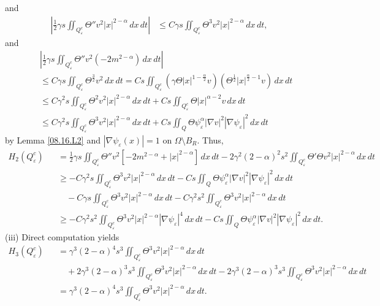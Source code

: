 \documentclass[11pt]{article}
\numberwithin{equation}{section}
\begin{document}
and
$$
\begin{aligned}
\left| \frac{1}{2}\gamma s \iint_{Q_\varepsilon^c} \Theta'' v^2 |x|^{2 - \alpha} \, dx \, dt \right| &\leq C\gamma s \iint_{Q_\varepsilon^c} \Theta^3 v^2 |x|^{2 - \alpha} \, dx \, dt,
\end{aligned}
$$
and
\begin{eqnarray*}
&&\left| \frac{1}{2}\gamma s \iint_{Q_\varepsilon^c} \Theta'' v^2 (-2m^{2 - \alpha}) \, dx \, dt \right| \\
&&\leq C\gamma s \iint_{Q_\varepsilon^c} \Theta^{\frac{3}{2}} v^2 \, dx \, dt = Cs \iint_{Q_\varepsilon^c} \left(\gamma \Theta |x|^{1 - \frac{\alpha}{2}} v\right) \left(\Theta^{\frac{1}{2}} |x|^{\frac{\alpha}{2} - 1} v\right) \, dx \, dt \\
&&\leq C\gamma^2 s \iint_{Q_\varepsilon^c} \Theta^2 v^2 |x|^{2 - \alpha} \, dx \, dt + C s \iint_{Q_\varepsilon^c} \Theta |x|^{\alpha - 2} v \, dx \, dt \\
&&\leq C\gamma^2s \iint_{Q_\varepsilon^c} \Theta^3 v^2 |x|^{2 - \alpha} \, dx \, dt + Cs \iint_{Q} \Theta \psi_\varepsilon^\alpha |\nabla v|^2 |\nabla \psi_\varepsilon|^2 \, dx \, dt
\end{eqnarray*}
by Lemma \ref{08.16.L2} and $|\nabla \psi_\varepsilon(x)| = 1$ on $\Omega \setminus B_R$.
Thus,
\begin{eqnarray*}
H_2(Q_\varepsilon^c) &&= \frac{1}{2}\gamma s \iint_{Q_\varepsilon^c} \Theta'' v^2 [-2m^{2 - \alpha} + |x|^{2 - \alpha}] \, dx \, dt - 2\gamma^2(2 - \alpha)^2s^2 \iint_{Q_\varepsilon^c} \Theta' \Theta v^2 |x|^{2 - \alpha} \, dx \, dt \\
&&\geq -C\gamma^2 s \iint_{Q_\varepsilon^c} \Theta^3 v^2 |x|^{2 - \alpha} \, dx \, dt - Cs \iint_{Q} \Theta \psi_\varepsilon^{\alpha} |\nabla v|^2 |\nabla \psi_\varepsilon|^2 \, dx \, dt \\
&&\quad -C\gamma s \iint_{Q_\varepsilon^c} \Theta^3 v^2 |x|^{2 - \alpha} \, dx \, dt - C\gamma^2s^2 \iint_{Q_\varepsilon^c} \Theta^3 v^2 |x|^{2 - \alpha} \, dx \, dt \\
&&\geq -C\gamma^2s^2 \iint_{Q_\varepsilon^c} \Theta^3 v^2 |x|^{2 - \alpha} |\nabla \psi_\varepsilon|^4 \, dx \, dt - Cs \iint_{Q} \Theta \psi_\varepsilon^{\alpha} |\nabla v|^2 |\nabla \psi_\varepsilon|^2 \, dx \, dt.
\end{eqnarray*}
(iii) Direct computation yields
\begin{eqnarray*}
H_3(Q_\varepsilon^c)
&&= \gamma^3(2 - \alpha)^4s^3 \iint_{Q_\varepsilon^c} \Theta^3 v^2 |x|^{2 - \alpha} \, dx \, dt \\
&&\quad + 2\gamma^3(2 - \alpha)^3s^3 \iint_{Q_\varepsilon^c} \Theta^3 v^2 |x|^{2 - \alpha} \, dx \, dt - 2\gamma^3(2 - \alpha)^3s^3 \iint_{Q_\varepsilon^c} \Theta^3 v^2 |x|^{2 - \alpha} \, dx \, dt \\
&&= \gamma^3 (2 - \alpha)^4s^3 \iint_{Q_\varepsilon^c} \Theta^3 v^2 |x|^{2 - \alpha} \, dx \, dt.
\end{eqnarray*}
\end{document}

